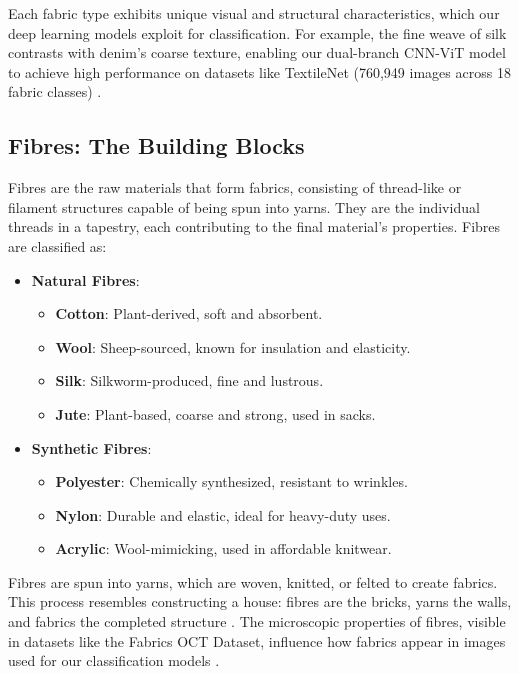 Each fabric type exhibits unique visual and structural characteristics, which our deep learning models exploit for classification. For example, the fine weave of silk contrasts with denim’s coarse texture, enabling our dual-branch \ac{CNN}-\ac{ViT} model to achieve high performance on datasets like TextileNet (760,949 images across 18 fabric classes) \citep{Zhong2023, Jatav2025}.

\subsection{Fibres: The Building Blocks}
\label{subsec:fibres}

Fibres are the raw materials that form fabrics, consisting of thread-like or filament structures capable of being spun into yarns. They are the individual threads in a tapestry, each contributing to the final material’s properties. Fibres are classified as:
\begin{itemize}
    \item \textbf{Natural Fibres}:
        \begin{itemize}
            \item \textbf{Cotton}: Plant-derived, soft and absorbent.
            \item \textbf{Wool}: Sheep-sourced, known for insulation and elasticity.
            \item \textbf{Silk}: Silkworm-produced, fine and lustrous.
            \item \textbf{Jute}: Plant-based, coarse and strong, used in sacks.
        \end{itemize}
    \item \textbf{Synthetic Fibres}:
        \begin{itemize}
            \item \textbf{Polyester}: Chemically synthesized, resistant to wrinkles.
            \item \textbf{Nylon}: Durable and elastic, ideal for heavy-duty uses.
            \item \textbf{Acrylic}: Wool-mimicking, used in affordable knitwear.
        \end{itemize}
\end{itemize}

Fibres are spun into yarns, which are woven, knitted, or felted to create fabrics. This process resembles constructing a house: fibres are the bricks, yarns the walls, and fabrics the completed structure \citep{Jatav2025}. The microscopic properties of fibres, visible in datasets like the Fabrics OCT Dataset, influence how fabrics appear in images used for our classification models \citep{Sabuncu2022}.

